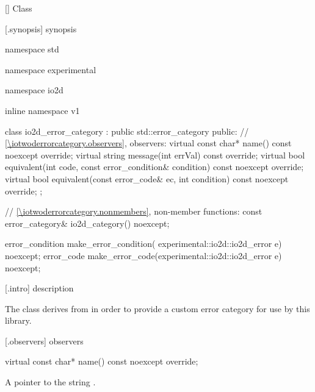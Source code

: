  [\iotwoderrorcategory] {Class }

 [\iotwoderrorcategory.synopsis] { 
synopsis}

\begin{codeblock}
namespace std { namespace experimental { namespace io2d { inline namespace v1 {
  class io2d_error_category : public std::error_category {
  public:
    // \ref{\iotwoderrorcategory.observers}, observers:
    virtual const char* name() const noexcept override;
    virtual string message(int errVal) const override;
    virtual bool equivalent(int code,
      const error_condition& condition) const noexcept override;
    virtual bool equivalent(const error_code& ec,
      int condition) const noexcept override;
  };
  
  // \ref{\iotwoderrorcategory.nonmembers}, non-member functions:
  const error_category& io2d_category() noexcept;
} } }

  error_condition make_error_condition(
    experimental::io2d::io2d_error e) noexcept;
  error_code make_error_code(experimental::io2d::io2d_error e) noexcept;
}
\end{codeblock}

 [\iotwoderrorcategory.intro] { 
description}

\pnum
{}
The  class derives from 
 in order to provide a custom error category for 
use by this library.

 [\iotwoderrorcategory.observers] { 
observers}

\begin{itemdecl}
virtual const char* name() const noexcept override;
\end{itemdecl}
\begin{itemdescr}
	\pnum
	\returns
	A pointer to the string .
\end{itemdescr}

